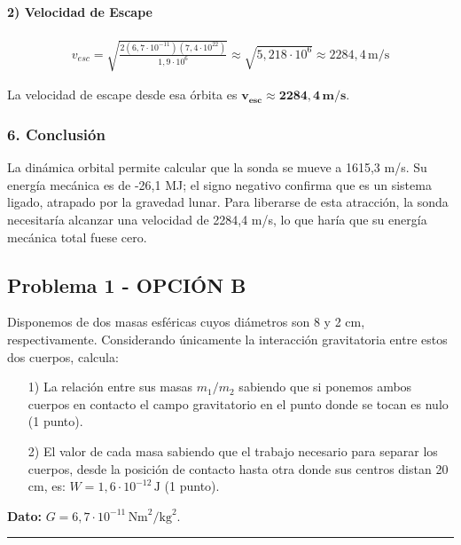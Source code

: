 \paragraph{2) Velocidad de Escape}
\begin{gather}
    v_{esc} = \sqrt{\frac{2(6,7\cdot10^{-11})(7,4\cdot10^{22})}{1,9\cdot10^6}} \approx \sqrt{5,218 \cdot 10^6} \approx 2284,4 \, \text{m/s}
\end{gather}
\begin{cajaresultado}
La velocidad de escape desde esa órbita es $\boldsymbol{v_{esc} \approx 2284,4 \, \textbf{m/s}}$.
\end{cajaresultado}

\subsubsection*{6. Conclusión}
\begin{cajaconclusion}
La dinámica orbital permite calcular que la sonda se mueve a 1615,3 m/s. Su energía mecánica es de -26,1 MJ; el signo negativo confirma que es un sistema ligado, atrapado por la gravedad lunar. Para liberarse de esta atracción, la sonda necesitaría alcanzar una velocidad de 2284,4 m/s, lo que haría que su energía mecánica total fuese cero.
\end{cajaconclusion}

\newpage

\subsection{Problema 1 - OPCIÓN B}
\label{subsec:1B_2008_jun_ord}

\begin{cajaenunciado}
Disponemos de dos masas esféricas cuyos diámetros son 8 y 2 cm, respectivamente. Considerando únicamente la interacción gravitatoria entre estos dos cuerpos, calcula:
\begin{enumerate}
    \item[1)] La relación entre sus masas $m_1/m_2$ sabiendo que si ponemos ambos cuerpos en contacto el campo gravitatorio en el punto donde se tocan es nulo (1 punto).
    \item[2)] El valor de cada masa sabiendo que el trabajo necesario para separar los cuerpos, desde la posición de contacto hasta otra donde sus centros distan 20 cm, es: $W=1,6\cdot10^{-12}\,\text{J}$ (1 punto).
\end{enumerate}
\textbf{Dato:} $G=6,7\cdot10^{-11}\,\text{Nm}^2/\text{kg}^2$.
\end{cajaenunciado}
\hrule

